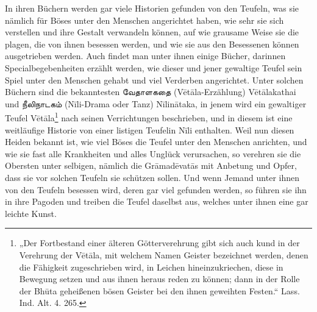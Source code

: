 \documentclass{article}
\newcommand{\TamilText}[1]{\texttamil{#1}}
\newcommand{\tam}[1]{\TamilText{#1}}
\begin{document}
In ihren Büchern werden gar viele Historien gefunden von den Teufeln, was sie nämlich für Böses unter den Menschen angerichtet haben, wie sehr sie sich verstellen und ihre Gestalt verwandeln können, auf wie grausame Weise sie die plagen, die von ihnen besessen werden, und wie sie aus den Besessenen können ausgetrieben werden. Auch findet man unter ihnen einige Bücher, darinnen Specialbegebenheiten erzählt werden, wie dieser und jener gewaltige Teufel sein Spiel unter den Menschen gehabt und viel Verderben angerichtet. Unter solchen Büchern sind die bekanntesten \tam{வேதாளகதை} (V\={e}t\={a}la-Erzählung) V\={e}t\={a}lakathai und \tam{நீலிநாடகம்} (N\={i}li-Drama oder Tanz) N\={i}lin\={a}taka, in jenem wird ein gewaltiger Teufel V\={e}t\={a}la\footnote{„Der Fortbestand einer älteren Götterverehrung gibt sich auch kund in der Verehrung der V\={e}t\={a}la, mit welchem Namen Geister bezeichnet werden, denen die Fähigkeit zugeschrieben wird, in Leichen hineinzukriechen, diese in Bewegung setzen und aus ihnen heraus reden zu können; dann in der Rolle der Bh\={u}ta geheißenen bösen Geister bei den ihnen geweihten Festen.“ Lass. Ind. Alt. 4. 265.} nach seinen Verrichtungen beschrieben, und in diesem ist eine weitläufige Historie von einer listigen Teufelin N\={i}li enthalten. Weil nun diesen Heiden bekannt ist, wie viel Böses die Teufel unter den Menschen anrichten, und wie sie fast alle Krankheiten und alles Unglück verursachen, so verehren sie die Obersten unter selbigen, nämlich die Gr\={a}mad\={e}vat\={a}s mit Anbetung und Opfer, dass sie vor solchen Teufeln sie schützen sollen. Und wenn Jemand unter ihnen von den Teufeln besessen wird, deren gar viel gefunden werden, so führen sie ihn in ihre Pagoden und treiben die Teufel daselbst aus, welches unter ihnen eine gar leichte Kunst.
\end{document}
